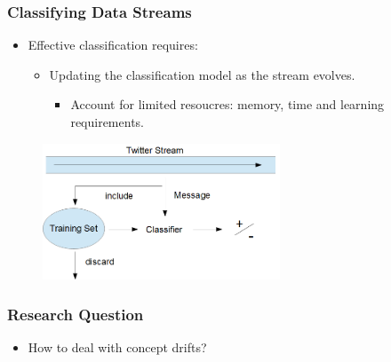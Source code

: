 \documentclass[14pt]{beamer}
\begin{document}
\begin{frame}\frametitle{Classifying Data Streams}

\begin{itemize}
\item Effective classification requires:
\begin{itemize}
\item Updating the classification model as the stream evolves.
\begin{itemize}
\item Account for limited resoucres: memory, time and learning requirements.
\end{itemize}
\end{itemize}
\end{itemize}

\vspace{-0.2in}
\begin{figure}
\centering
\includegraphics[height=1.60in]{stream2}
\end{figure}
\end{frame}


\begin{frame}\frametitle{Research Question}

\begin{itemize}
\item How to deal with concept drifts?
\end{itemize}

\end{frame}




\end{document}
